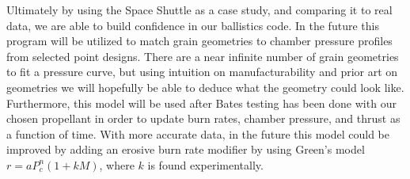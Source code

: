 Ultimately by using the Space Shuttle as a case study, and comparing it to real data, we are able to build confidence in our ballistics code. In the future this program will be utilized to match grain geometries to chamber pressure profiles from selected point designs. There are a near infinite number of grain geometries to fit a pressure curve, but using intuition on manufacturability and prior art on geometries we will hopefully be able to deduce what the geometry could look like. Furthermore, this model will be used after Bates testing has been done with our chosen propellant in order to update burn rates, chamber pressure, and thrust as a function of time. With more accurate data, in the future this model could be improved by adding an erosive burn rate modifier by using Green’s model \(r = a P_c^n (1 + k M)\), where \(k\) is found experimentally.

